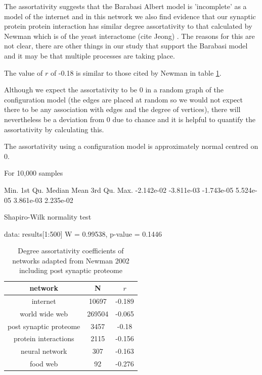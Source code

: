 The assortativity suggests that the Barabasi Albert model is 'incomplete' as a model of the internet \cite{newman2002assortative} and in this network we also find evidence that our synaptic protein protein interaction has similar degree assortativity to that calculated by Newman which is of the yeast interactome (cite Jeong) . The reasons for this are not clear, there are other things in our study that support the Barabasi model and it may be that multiple processes are taking place. 

The value of $r$ of -0.18  is similar to those cited by Newman \cite{newman2002assortative} in table \ref{Table:DegreeAssortativityNewman}. 

Although we expect the assortativity to be 0 in a random graph of the configuration model (the edges are placed at random so we would not expect there to be any association with edges and the degree of vertices), there will nevertheless be a deviation from 0 due to chance and it is helpful to quantify the assortativity by calculating this. 

The assortativity using a configuration model  is approximately normal centred on 0.

For 10,000 samples   

Min.    1st Qu.     Median       Mean    3rd Qu.       Max. 
-2.142e-02 -3.811e-03 -1.743e-05  5.524e-05  3.861e-03  2.235e-02 

Shapiro-Wilk normality test

data:  results[1:500]
W = 0.99538, p-value = 0.1446


\begin{table}[]
    \centering
    \begin{tabular}{c|c|c}
       network  &N& $r$  \\
       \hline
       internet & 10697&-0.189\\
       world wide web &269504 & -0.065\\
       post synaptic proteome & 3457 & -0.18\\
       protein interactions & 2115 & -0.156\\
       neural network & 307 & -0.163\\
       food web & 92 & -0.276 \\
       
       
         
    \end{tabular}
    \caption{Degree assortativity coefficients of networks adapted from Newman 2002 \cite{newman2002assortative} including post synaptic proteome}
    \label{Table:DegreeAssortativityNewman}
\end{table}

